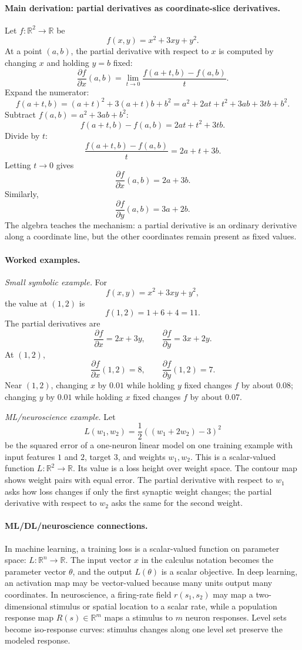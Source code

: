\paragraph{Main derivation: partial derivatives as coordinate-slice derivatives.}
Let \(f:\mathbb{R}^2\to\mathbb{R}\) be
\[
f(x,y)=x^2+3xy+y^2.
\]
At a point \((a,b)\), the partial derivative with respect to \(x\) is computed by changing \(x\) and holding \(y=b\) fixed:
\[
\frac{\partial f}{\partial x}(a,b)
=\lim_{t\to 0}\frac{f(a+t,b)-f(a,b)}{t}.
\]
Expand the numerator:
\[
f(a+t,b)=(a+t)^2+3(a+t)b+b^2
=a^2+2at+t^2+3ab+3tb+b^2.
\]
Subtract \(f(a,b)=a^2+3ab+b^2\):
\[
f(a+t,b)-f(a,b)=2at+t^2+3tb.
\]
Divide by \(t\):
\[
\frac{f(a+t,b)-f(a,b)}{t}=2a+t+3b.
\]
Letting \(t\to0\) gives
\[
\frac{\partial f}{\partial x}(a,b)=2a+3b.
\]
Similarly,
\[
\frac{\partial f}{\partial y}(a,b)=3a+2b.
\]
The algebra teaches the mechanism: a partial derivative is an ordinary derivative along a coordinate line, but the other coordinates remain present as fixed values.

\paragraph{Worked examples.}
\emph{Small symbolic example.} For
\[
f(x,y)=x^2+3xy+y^2,
\]
the value at \((1,2)\) is
\[
f(1,2)=1+6+4=11.
\]
The partial derivatives are
\[
\frac{\partial f}{\partial x}=2x+3y,
\qquad
\frac{\partial f}{\partial y}=3x+2y.
\]
At \((1,2)\),
\[
\frac{\partial f}{\partial x}(1,2)=8,
\qquad
\frac{\partial f}{\partial y}(1,2)=7.
\]
Near \((1,2)\), changing \(x\) by \(0.01\) while holding \(y\) fixed changes \(f\) by about \(0.08\); changing \(y\) by \(0.01\) while holding \(x\) fixed changes \(f\) by about \(0.07\).

\emph{ML/neuroscience example.} Let
\[
L(w_1,w_2)=\frac{1}{2}\left((w_1+2w_2)-3\right)^2
\]
be the squared error of a one-neuron linear model on one training example with input features \(1\) and \(2\), target \(3\), and weights \(w_1,w_2\). This is a scalar-valued function \(L:\mathbb{R}^2\to\mathbb{R}\). Its value is a loss height over weight space. The contour map shows weight pairs with equal error. The partial derivative with respect to \(w_1\) asks how loss changes if only the first synaptic weight changes; the partial derivative with respect to \(w_2\) asks the same for the second weight.

\paragraph{ML/DL/neuroscience connections.}
In machine learning, a training loss is a scalar-valued function on parameter space: \(L:\mathbb{R}^n\to\mathbb{R}\). The input vector \(x\) in the calculus notation becomes the parameter vector \(\theta\), and the output \(L(\theta)\) is a scalar objective. In deep learning, an activation map may be vector-valued because many units output many coordinates. In neuroscience, a firing-rate field \(r(s_1,s_2)\) may map a two-dimensional stimulus or spatial location to a scalar rate, while a population response map \(R(s)\in\mathbb{R}^m\) maps a stimulus to \(m\) neuron responses. Level sets become iso-response curves: stimulus changes along one level set preserve the modeled response.

